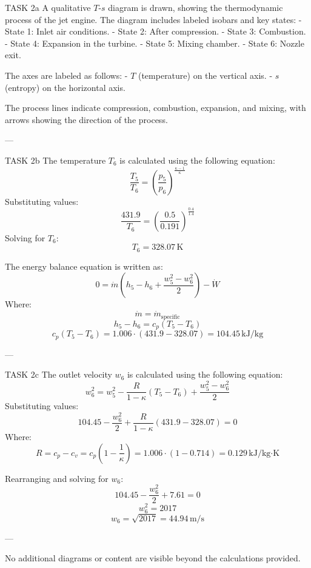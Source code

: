 TASK 2a  
A qualitative \( T \)-\( s \) diagram is drawn, showing the thermodynamic process of the jet engine. The diagram includes labeled isobars and key states:  
- State 1: Inlet air conditions.  
- State 2: After compression.  
- State 3: Combustion.  
- State 4: Expansion in the turbine.  
- State 5: Mixing chamber.  
- State 6: Nozzle exit.  

The axes are labeled as follows:  
- \( T \) (temperature) on the vertical axis.  
- \( s \) (entropy) on the horizontal axis.  

The process lines indicate compression, combustion, expansion, and mixing, with arrows showing the direction of the process.  

---

TASK 2b  
The temperature \( T_6 \) is calculated using the following equation:  
\[
\frac{T_5}{T_6} = \left( \frac{p_5}{p_6} \right)^{\frac{\kappa - 1}{\kappa}}
\]  
Substituting values:  
\[
\frac{431.9}{T_6} = \left( \frac{0.5}{0.191} \right)^{\frac{0.4}{1.4}}
\]  
Solving for \( T_6 \):  
\[
T_6 = 328.07 \, \text{K}
\]  

The energy balance equation is written as:  
\[
0 = \dot{m} \left( h_5 - h_6 + \frac{w_5^2 - w_6^2}{2} \right) - \dot{W}
\]  
Where:  
\[
\dot{m} = \dot{m}_{\text{specific}}
\]  
\[
h_5 - h_6 = c_p (T_5 - T_6)
\]  
\[
c_p (T_5 - T_6) = 1.006 \cdot (431.9 - 328.07) = 104.45 \, \text{kJ/kg}
\]  

---

TASK 2c  
The outlet velocity \( w_6 \) is calculated using the following equation:  
\[
w_6^2 = w_5^2 - \frac{R}{1 - \kappa} (T_5 - T_6) + \frac{w_5^2 - w_6^2}{2}
\]  
Substituting values:  
\[
104.45 - \frac{w_6^2}{2} + \frac{R}{1 - \kappa} (431.9 - 328.07) = 0
\]  
Where:  
\[
R = c_p - c_v = c_p \left( 1 - \frac{1}{\kappa} \right) = 1.006 \cdot (1 - 0.714) = 0.129 \, \text{kJ/kg·K}
\]  

Rearranging and solving for \( w_6 \):  
\[
104.45 - \frac{w_6^2}{2} + 7.61 = 0
\]  
\[
w_6^2 = 2017
\]  
\[
w_6 = \sqrt{2017} = 44.94 \, \text{m/s}
\]  

---

No additional diagrams or content are visible beyond the calculations provided.